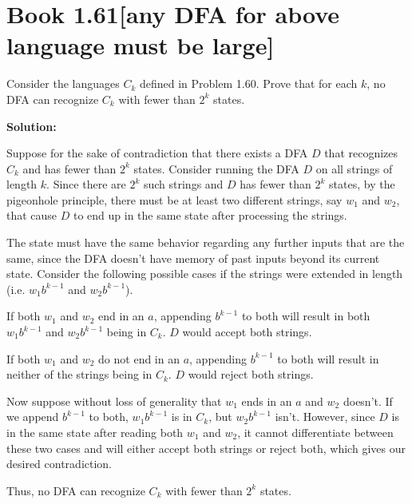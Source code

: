 \documentclass[11pt]{article}
\newenvironment{question}[2]
{\newpage\section{#1\texorpdfstring{\hfill}{horizontal spacing}{\rm\normalsize #2}}}{}
\newenvironment{solution}
{\textbf{Solution: }\color{blue}}
{\color{black}}
\begin{document}
\begin{question}{Book 1.61}{[any DFA for above language must be large]}

Consider the languages \(C_k\) defined in Problem 1.60. Prove that for each \(k\), no DFA can recognize \(C_k\) with fewer than \(2^k\) states.

\begin{solution}

Suppose for the sake of contradiction that there exists a DFA \(D\) that recognizes \(C_k\) and has fewer than \(2^k\) states. Consider running the DFA \(D\) on all strings of length \(k\). Since there are \(2^k\) such strings and \(D\) has fewer than \(2^k\) states, by the pigeonhole principle, there must be at least two different strings, say \(w_1\) and \(w_2\), that cause \(D\) to end up in the same state after processing the strings.

The state must have the same behavior regarding any further inputs that are the same, since the DFA doesn't have memory of past inputs beyond its current state. Consider the following possible cases if the strings were extended in length (i.e. \(w_1 b^{k-1}\) and \(w_2 b^{k-1}\)).

If both \(w_1\) and \(w_2\) end in an \(a\), appending \(b^{k-1}\) to both will result in both \(w_1 b^{k-1}\) and \(w_2 b^{k-1}\) being in \(C_k\). \(D\) would accept both strings.

If both \(w_1\) and \(w_2\) do not end in an \(a\), appending \(b^{k-1}\) to both will result in neither of the strings being in \(C_k\). \(D\) would reject both strings.

Now suppose without loss of generality that \(w_1\) ends in an \(a\) and \(w_2\) doesn't. If we append \(b^{k-1}\) to both, \(w_1 b^{k-1}\) is in \(C_k\), but \(w_2 b^{k-1}\) isn't. However, since \(D\) is in the same state after reading both \(w_1\) and \(w_2\), it cannot differentiate between these two cases and will either accept both strings or reject both, which gives our desired contradiction.

Thus, no DFA can recognize \(C_k\) with fewer than \(2^k\) states.

\end{solution}
\end{question}

\end{document}
